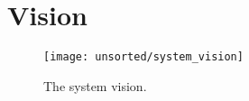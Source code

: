 
\section{Vision}
\label{sec:vision}

\begin{figure}[!htbp]
    \centering
    \texttt{[image: unsorted/system\_vision]}
    \caption{The system vision.}
    \label{fig:system_vision}
\end{figure}